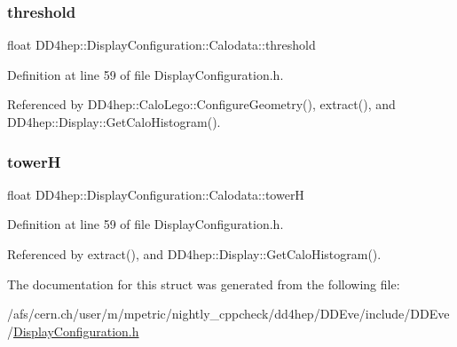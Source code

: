 \hypertarget{struct_d_d4hep_1_1_display_configuration_1_1_calodata_a83c052550585418a3f64e5b1b34d5d76}{}\label{struct_d_d4hep_1_1_display_configuration_1_1_calodata_a83c052550585418a3f64e5b1b34d5d76} 
\subsubsection{\texorpdfstring{threshold}{threshold}}
{\footnotesize\ttfamily float D\+D4hep\+::\+Display\+Configuration\+::\+Calodata\+::threshold}



Definition at line 59 of file Display\+Configuration.\+h.



Referenced by D\+D4hep\+::\+Calo\+Lego\+::\+Configure\+Geometry(), extract(), and D\+D4hep\+::\+Display\+::\+Get\+Calo\+Histogram().

\hypertarget{struct_d_d4hep_1_1_display_configuration_1_1_calodata_a9b1ac13cbc2a38b0b9fed9d8d431060c}{}\label{struct_d_d4hep_1_1_display_configuration_1_1_calodata_a9b1ac13cbc2a38b0b9fed9d8d431060c} 
\subsubsection{\texorpdfstring{towerH}{towerH}}
{\footnotesize\ttfamily float D\+D4hep\+::\+Display\+Configuration\+::\+Calodata\+::towerH}



Definition at line 59 of file Display\+Configuration.\+h.



Referenced by extract(), and D\+D4hep\+::\+Display\+::\+Get\+Calo\+Histogram().



The documentation for this struct was generated from the following file\+:\begin{DoxyCompactItemize}
\item 
/afs/cern.\+ch/user/m/mpetric/nightly\+\_\+cppcheck/dd4hep/\+D\+D\+Eve/include/\+D\+D\+Eve/\hyperlink{_display_configuration_8h}{Display\+Configuration.\+h}\end{DoxyCompactItemize}
